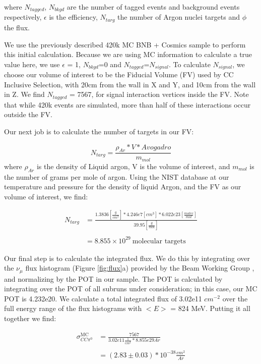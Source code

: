 \noindent where $N_{tagged}$, $N_{bkgd}$ are the number of tagged events and background events respectively, $\epsilon$ is the efficiency, $N_{targ}$ the number of Argon nuclei targets and $\phi$ the flux. 
\par We use the previously described 420k MC BNB + Cosmics sample to perform this initial calculation.  Because we are using MC information to calculate a true value here, we use $\epsilon$ = 1, $N_{bkgd}$=0 and $N_{tagged}$=$N_{signal}$.  To calculate $N_{signal}$, we choose our volume of interest to be the Fiducial Volume (FV) used by CC Inclusive Selection, with 20cm from the wall in X and Y, and 10cm from the wall in Z. We find $N_{tagged}$ = 7567, for signal interaction vertices inside the FV. Note that while 420k events are simulated, more than half of these interactions occur outside the FV. 
\par Our next job is to calculate the number of targets in our FV:

\begin{equation} \label{eq:1}
  N_{targ} = \frac{\rho_{Ar} * V * Avogadro}{m_{mol}} 
\end{equation}
\noindent where $\rho_{Ar}$ is the density of Liquid argon, V is the volume of interest, and $m_{mol}$ is the number of grams per mole of argon.  Using the NIST database at our temperature and pressure for the density of liquid Argon, and the FV as our volume of interest, we find: 

\begin{align}
N_{targ} &= \frac{1.3836 [\frac{g}{cm^3}] * 4.246e7 [cm^3] * 6.022e23 [\frac{molec}{mol}]}{39.95 [\frac{g}{mol}]} \\\\
&= 8.855\times10^{29}~\text{molecular targets}
\end{align}

\par Our final step is to calculate the integrated flux.  We do this by integrating over the $\nu_\mu$ flux histogram (Figure \ref{fig:flux}a) provided by the Beam Working Group \cite{bib:flux}, and normalizing by the POT in our sample. The POT is calculated by integrating over the POT of all subruns under consideration; in this case, our MC POT is 4.232e20.  We calculate a total integrated flux of 3.02e11 $cm^{-2}$ over the full energy range of the flux histograms with $<E>$ = 824 MeV. 
\noindent Putting it all together we find:


\begin{align}
\sigma^{\text{MC}}_{CC\pi^0} &= \frac{7567}{3.02e11 \frac{1}{cm^2} * 8.855e29 Ar } \\\\
&= (2.83 \pm 0.03) *10^{-38} \frac{cm^2}{Ar}
\end{align}

